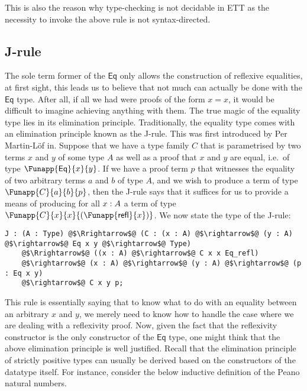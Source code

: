 \documentclass[12pt,twoside,maitrise]{dms}
\theoremstyle{definition}
\numberwithin{equation}{section}
\numberwithin{table}{chapter}
\numberwithin{figure}{chapter}
\newcommand\kw[1] {\textsf{#1}}
\begin{document}
This is also the reason why type-checking is not decidable in ETT as the
necessity to invoke the above rule is not syntax-directed.


\subsection*{J-rule}\label{subsec:j-rule}
The sole term former of the $\kw{Eq}$ only allows the construction of reflexive
equalities, at first sight, this leads us to believe that not much can actually
be done with the $\kw{Eq}$ type. After all, if all we had were proofs of the
form $x = x$, it would be difficult to imagine achieving anything with them. The
true magic of the equality type lies in its elimination principle.
Traditionally, the equality type comes with an elimination principle known as
the J-rule. This was first introduced by Per Martin-Löf
in\cite{martin1975intuitionistic}. Suppose that we have a type family $C$ that
is parametrised by two terms $x$ and $y$ of some type $A$ as well as a proof
that $x$ and $y$ are equal, i.e.\ of type $\Funapp{\kw{Eq}}{x}{y}$. If we have
a proof term $p$ that witnesses the equality of two arbitrary terms $a$ and
$b$ of type $A$, and we wish to produce a term of type $\Funapp{C}{a}{b}{p}$,
then the J-rule says that it suffices for us to provide a means of producing for
all $\oftype{x}{A}$ a term of type $\Funapp{C}{x}{x}{(\Funapp{\kw{refl}}{x})}$.
We now state the type of the J-rule:

\begin{verbatim}
J : (A : Type) @$\Rrightarrow$@ (C : (x : A) @$\rightarrow$@ (y : A) @$\rightarrow$@ Eq x y @$\rightarrow$@ Type)
    @$\Rrightarrow$@ ((x : A) @$\rightarrow$@ C x x Eq_refl)
    @$\rightarrow$@ (x : A) @$\rightarrow$@ (y : A) @$\rightarrow$@ (p : Eq x y)
    @$\rightarrow$@ C x y p;
\end{verbatim}

This rule is essentially saying that to know what to do with an
equality between an arbitrary $x$ and $y$, we merely need to know how to handle
the case where we are dealing with a reflexivity proof. Now, given the fact that the
reflexivity constructor is the only constructor of the $\kw{Eq}$ type, one might
think that the above elimination principle is well justified. Recall that
the elimination principle of strictly positive types\cite{abbott2005containers} can
usually be derived based on the constructors of the datatype itself. For
instance, consider the below inductive definition of the Peano natural numbers.
\end{document}
